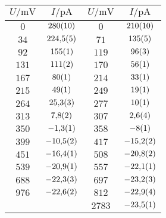 \begin{figure}[htbp]
{\begin{tabular}{cc||cc}
\hline
$U / \unit{\milli\volt}$ & $I / \unit{\pico\ampere}$ & $U / \unit{\milli\volt}$ & $I / \unit{\pico\ampere}$ \\ 
\hline
$\num{0}$ & $\num{280\pm 10}$ & $\num{0}$ & $\num{210\pm 10}$ \\
$\num{34}$ & $\num{224.5\pm 0.5}$ & $\num{71}$ & $\num{135\pm 5}$ \\
$\num{92}$ & $\num{155\pm 1}$ & $\num{119}$ & $\num{96\pm 3}$ \\
$\num{131}$ & $\num{111\pm 2}$ & $\num{170}$ & $\num{56\pm 1}$ \\
$\num{167}$ & $\num{80\pm 1}$ & $\num{214}$ & $\num{33\pm 1}$ \\
$\num{215}$ & $\num{49\pm 1}$ & $\num{249}$ & $\num{19\pm 1}$ \\
$\num{264}$ & $\num{25.3\pm 0.3}$ & $\num{277}$ & $\num{10\pm 1}$ \\
$\num{313}$ & $\num{7.8\pm 0.2}$ & $\num{307}$ & $\num{2.6\pm 0.4}$ \\
$\num{350}$ & $\num{-1.3\pm 0.1}$ & $\num{358}$ & $\num{-8\pm 1}$ \\
$\num{399}$ & $\num{-10.5\pm 0.2}$ & $\num{417}$ & $\num{-15.2\pm 0.2}$ \\
$\num{451}$ & $\num{-16.4\pm 0.1}$ & $\num{508}$ & $\num{-20.8\pm 0.2}$ \\
$\num{539}$ & $\num{-20.9\pm 0.1}$ & $\num{557}$ & $\num{-22.1\pm 0.1}$ \\
$\num{688}$ & $\num{-22.3\pm 0.3}$ & $\num{697}$ & $\num{-23.2\pm 0.3}$ \\
$\num{976}$ & $\num{-22.6\pm 0.2}$ & $\num{812}$ & $\num{-22.9\pm 0.4}$ \\
   &    & $\num{2783}$ & $\num{-23.5\pm 0.1}$ \\
\hline\end{tabular}
\label{kennlinie_546nm}
}\end{figure}